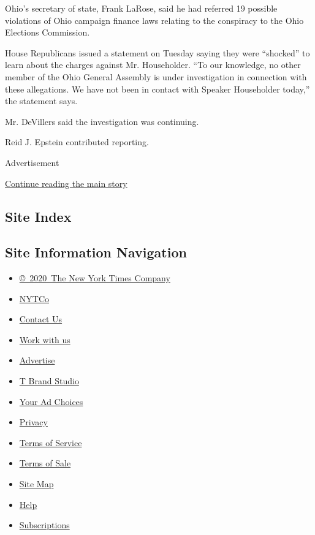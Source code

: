 Ohio's secretary of state, Frank LaRose, said he had referred 19
possible violations of Ohio campaign finance laws relating to the
conspiracy to the Ohio Elections Commission.

House Republicans issued a statement on Tuesday saying they were
``shocked'' to learn about the charges against Mr. Householder. ``To our
knowledge, no other member of the Ohio General Assembly is under
investigation in connection with these allegations. We have not been in
contact with Speaker Householder today,'' the statement says.

Mr. DeVillers said the investigation was continuing.

Reid J. Epstein contributed reporting.

Advertisement

\protect\hyperlink{after-bottom}{Continue reading the main story}

\hypertarget{site-index}{%
\subsection{Site Index}\label{site-index}}

\hypertarget{site-information-navigation}{%
\subsection{Site Information
Navigation}\label{site-information-navigation}}

\begin{itemize}
\tightlist
\item
  \href{https://help.nytimes.com/hc/en-us/articles/115014792127-Copyright-notice}{©~2020~The
  New York Times Company}
\end{itemize}

\begin{itemize}
\tightlist
\item
  \href{https://www.nytco.com/}{NYTCo}
\item
  \href{https://help.nytimes.com/hc/en-us/articles/115015385887-Contact-Us}{Contact
  Us}
\item
  \href{https://www.nytco.com/careers/}{Work with us}
\item
  \href{https://nytmediakit.com/}{Advertise}
\item
  \href{http://www.tbrandstudio.com/}{T Brand Studio}
\item
  \href{https://www.nytimes.com/privacy/cookie-policy\#how-do-i-manage-trackers}{Your
  Ad Choices}
\item
  \href{https://www.nytimes.com/privacy}{Privacy}
\item
  \href{https://help.nytimes.com/hc/en-us/articles/115014893428-Terms-of-service}{Terms
  of Service}
\item
  \href{https://help.nytimes.com/hc/en-us/articles/115014893968-Terms-of-sale}{Terms
  of Sale}
\item
  \href{https://spiderbites.nytimes.com}{Site Map}
\item
  \href{https://help.nytimes.com/hc/en-us}{Help}
\item
  \href{https://www.nytimes.com/subscription?campaignId=37WXW}{Subscriptions}
\end{itemize}
